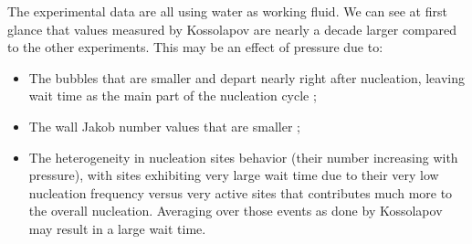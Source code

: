 \begin{table}[h!]


\noindent{}

\caption{Bubble wait time data in vertical flow boiling. Wall superheat values for Richenderfer data are estimated using Frost \& Dzakowic correlation (Eq. \ref{eq:frost}).}
\label{tab:tw_exp_data}


\end{table}

The experimental data are all using water as working fluid. We can see at first glance that values measured by Kossolapov are nearly a decade larger compared to the other experiments. This may be an effect of pressure due to:

\begin{itemize}
\item The bubbles that are smaller and depart nearly right after nucleation, leaving wait time as the main part of the nucleation cycle ;
\item The wall Jakob number values that are smaller ;
\item The heterogeneity in nucleation sites behavior (their number increasing with pressure), with sites exhibiting very large wait time due to their very low nucleation frequency versus very active sites that contributes much more to the overall nucleation. Averaging over those events as done by Kossolapov \cite{kossolapov_experimental_2021} may result in a large wait time.
\end{itemize}


